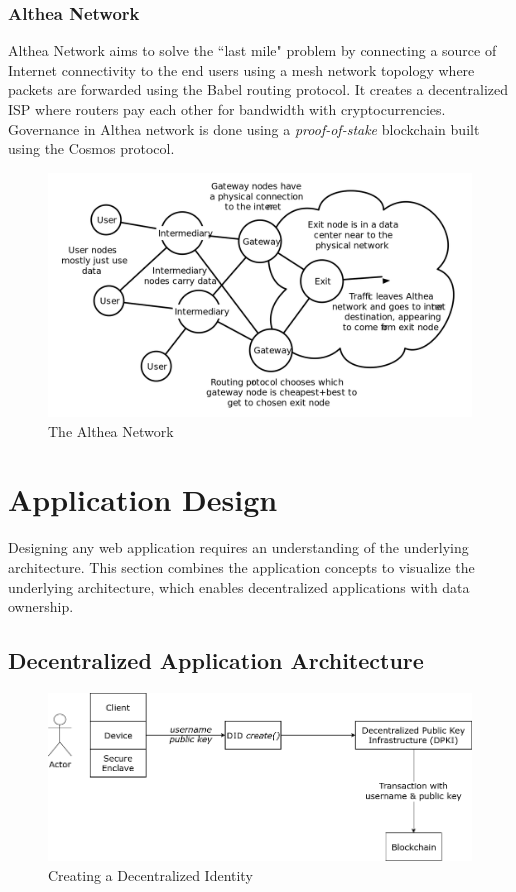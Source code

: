 		\subsubsection{Althea Network}
		Althea\cite{althea:whitepaper:1} Network aims to solve the ``last mile" problem by connecting a source of Internet connectivity to the end users using a mesh network topology where packets are forwarded using the Babel routing protocol\cite{chroboczek2011babel}. It creates a decentralized ISP where routers pay each other for bandwidth with cryptocurrencies. Governance in Althea network is done using a \textit{proof-of-stake} blockchain built using the Cosmos\cite{cosmos:network:1} protocol.
		
		\begin{figure}[h]
			\includegraphics[width=\linewidth]{figures/althea-network}
			\caption{\label{fig:althea-network} The Althea Network\protect\footnotemark}
		\end{figure}

\cleardoublepage
\section{Application Design}
	Designing any web application requires an understanding of the underlying architecture. This section combines the application concepts to visualize the underlying architecture, which enables decentralized applications with data ownership.
	
	\subsection{Decentralized Application Architecture}
	\begin{figure}[h]
		\includegraphics[width=\linewidth]{figures/did-create}
		\caption{\label{fig:did-create} Creating a Decentralized Identity}
	\end{figure}


